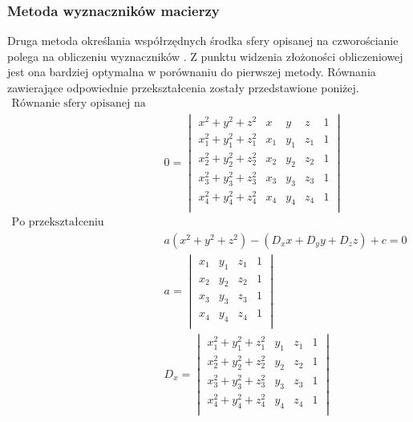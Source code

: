 \subsubsection{Metoda wyznaczników macierzy}
Druga metoda określania współrzędnych środka sfery opisanej na czworościanie polega na obliczeniu wyznaczników \cite{CircumTetraWolf}. Z punktu widzenia złożoności obliczeniowej jest ona bardziej optymalna w porównaniu do pierwszej metody. Równania zawierające odpowiednie przekształcenia zostały przedstawione poniżej.
\begin{equation}
    \begin{aligned}
    \text{Równanie sfery opisanej na czworościanie ma postać}\\
            &0=\begin{vmatrix}
                x^2+y^2+z^2 & x&y&z&1 \\
                x_{1}^2+y_{1}^2+z_{1}^2 & x_{1}&y_{1}&z_{1}&1 \\
                x_{2}^2+y_{2}^2+z_{2}^2 & x_{2}&y_{2}&z_{2}&1 \\
                x_{3}^2+y_{3}^2+z_{3}^2 & x_{3}&y_{3}&z_{3}&1 \\
                x_{4}^2+y_{4}^2+z_{4}^2 & x_{4}&y_{4}&z_{4}&1 \\
            \end{vmatrix}\\
            \text{Po przekształceniu wyznacznika}\\
            &a(x^2+y^2+z^2)-(D_{x}x+D_{y}y+D_{z}z)+c=0\\
            &a=\begin{vmatrix}
               x_{1}&y_{1}&z_{1}&1 \\
                x_{2}&y_{2}&z_{2}&1 \\
                x_{3}&y_{3}&z_{3}&1 \\
                x_{4}&y_{4}&z_{4}&1 \\
            \end{vmatrix}\\
            &D_{x}=\begin{vmatrix}
                x_{1}^2+y_{1}^2+z_{1}^2 &y_{1}&z_{1}&1 \\
                x_{2}^2+y_{2}^2+z_{2}^2 & y_{2}&z_{2}&1 \\
                x_{3}^2+y_{3}^2+z_{3}^2 &y_{3}&z_{3}&1 \\
                x_{4}^2+y_{4}^2+z_{4}^2 &y_{4}&z_{4}&1 \\
            \end{vmatrix}\\

\end{aligned}
\end{equation}
